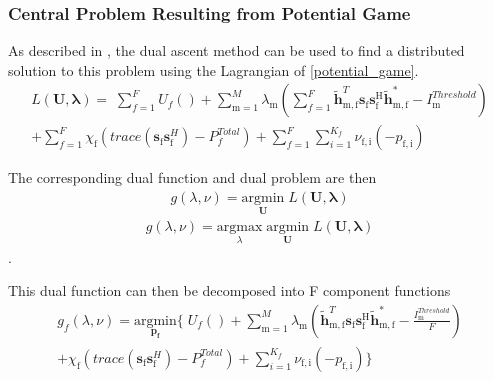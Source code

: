 \documentclass[12pt,a4paper]{report}
\begin{document}
\subsubsection{Central Problem Resulting from Potential Game}
As described in \cite[p.~8,9]{boyd2011distributed}, the dual ascent method can be used to find a distributed solution to this problem using the Lagrangian of \eqref{potential_game}. 
\\
\begin{multline}
L(\mathbf{U,\lambda}) = 
\;
\sum_{f=1}^F U_f() 
+
\sum_{\mathrm{m=1}}^M \lambda_{\mathrm{m}}
(	  \sum^F_{f=1} \mathbf{\tilde{h}}_{\mathrm{m,f}}^T  \mathbf{s}_{\mathrm{f}} 						
	\mathbf{s_{\mathrm{f}}^{\mathrm{H}}} \mathbf{\tilde{h}_{\mathrm{m,f}}^*} - I^{Threshold}		
	_{\mathrm{m}} )
\\
+ 
\sum_{f=1}^F
\chi_{\mathrm{f}}(trace(\mathbf{s}_\mathrm{f}\mathbf{s}_\mathrm{f}^H)-P^{Total}_{f} )
+
\sum_{f=1}^F
\sum_{i=1}^{K_f}
\nu_{\mathrm{f,i}}(-p_{\mathrm{f,i}})
\end{multline}

The corresponding dual function and dual problem are then 
\begin{gather*}
g(\lambda,\nu) = \underset{\mathbf{U}}{\mathrm{argmin}}\;L(\mathbf{U,\lambda})
\end{gather*}
\begin{gather*}
g(\lambda,\nu) = \underset{\lambda}{\mathrm{argmax}}\;\underset{\mathbf{U}}{\mathrm{argmin}}\;L(\mathbf{U,\lambda})
\end{gather*}
.



This dual function can then be decomposed into F component functions
\begin{multline}
g_f(\lambda,\nu) = \underset{\mathbf{p_f}}{\mathrm{argmin}}
\{
\;
U_f() 
+
\sum_{\mathrm{m=1}}^M \lambda_{\mathrm{m}}
(\mathbf{\tilde{h}}_{\mathrm{m,f}}^T  \mathbf{s}_{\mathrm{f}} 						
	\mathbf{s_{\mathrm{f}}^{\mathrm{H}}} \mathbf{\tilde{h}_{\mathrm{m,f}}^*} - \frac{I^{Threshold}_{\mathrm{m}}}{F})
\\
+ 
\chi_{\mathrm{f}}(trace(\mathbf{s}_\mathrm{f}\mathbf{s}_\mathrm{f}^H)-P^{Total}_{f} )
+
\sum_{i=1}^{K_f}
\nu_{\mathrm{f,i}}(-p_{\mathrm{f,i}})\}
\end{multline}
\\
\end{document}
